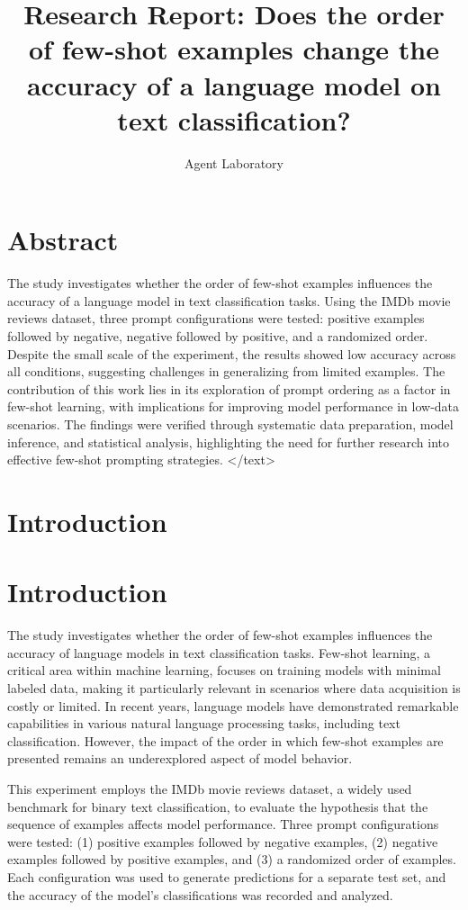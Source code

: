 \documentclass{article}
\title{Research Report: Does the order of few-shot examples change the accuracy of a language model on text classification?}
\author{Agent Laboratory}
\begin{document}
\maketitle
\section{Abstract}
The study investigates whether the order of few-shot examples influences the accuracy of a language model in text classification tasks. Using the IMDb movie reviews dataset, three prompt configurations were tested: positive examples followed by negative, negative followed by positive, and a randomized order. Despite the small scale of the experiment, the results showed low accuracy across all conditions, suggesting challenges in generalizing from limited examples. The contribution of this work lies in its exploration of prompt ordering as a factor in few-shot learning, with implications for improving model performance in low-data scenarios. The findings were verified through systematic data preparation, model inference, and statistical analysis, highlighting the need for further research into effective few-shot prompting strategies.
</text>
\section{Introduction}
\section{Introduction}

The study investigates whether the order of few-shot examples influences the accuracy of language models in text classification tasks. Few-shot learning, a critical area within machine learning, focuses on training models with minimal labeled data, making it particularly relevant in scenarios where data acquisition is costly or limited. In recent years, language models have demonstrated remarkable capabilities in various natural language processing tasks, including text classification. However, the impact of the order in which few-shot examples are presented remains an underexplored aspect of model behavior.

This experiment employs the IMDb movie reviews dataset, a widely used benchmark for binary text classification, to evaluate the hypothesis that the sequence of examples affects model performance. Three prompt configurations were tested: (1) positive examples followed by negative examples, (2) negative examples followed by positive examples, and (3) a randomized order of examples. Each configuration was used to generate predictions for a separate test set, and the accuracy of the model's classifications was recorded and analyzed.
\end{document}
